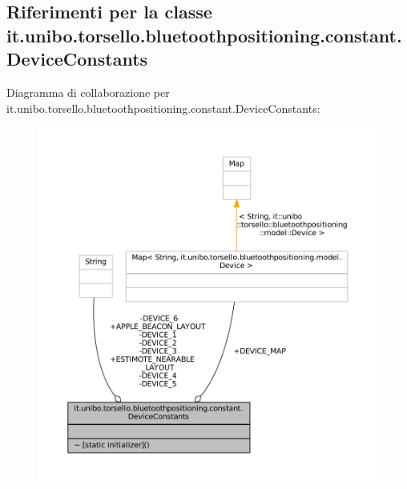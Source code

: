 \hypertarget{classit_1_1unibo_1_1torsello_1_1bluetoothpositioning_1_1constant_1_1DeviceConstants}{}\subsection{Riferimenti per la classe it.\+unibo.\+torsello.\+bluetoothpositioning.\+constant.\+Device\+Constants}
\label{classit_1_1unibo_1_1torsello_1_1bluetoothpositioning_1_1constant_1_1DeviceConstants}


Diagramma di collaborazione per it.\+unibo.\+torsello.\+bluetoothpositioning.\+constant.\+Device\+Constants\+:
\nopagebreak
\begin{figure}[H]
\begin{center}
\leavevmode
\includegraphics[width=350pt]{classit_1_1unibo_1_1torsello_1_1bluetoothpositioning_1_1constant_1_1DeviceConstants__coll__graph}
\end{center}
\end{figure}
